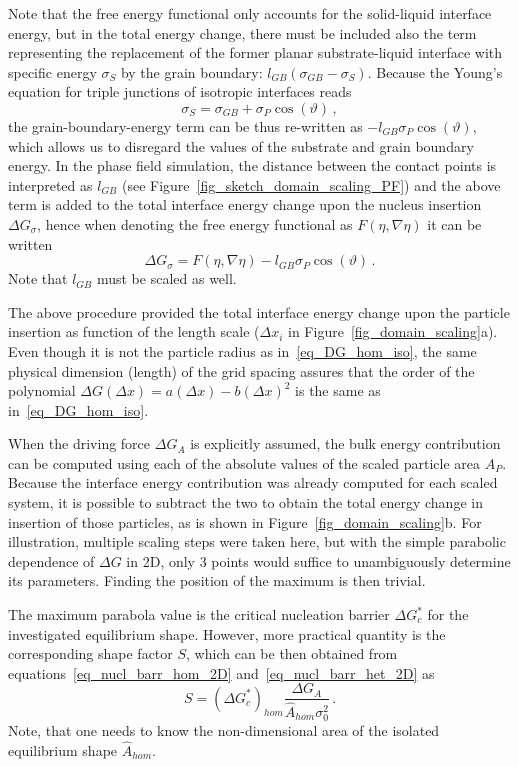 Note that the free energy functional only accounts for the solid-liquid interface energy, but in the total energy change, there must be included also the term representing the replacement of the former planar substrate-liquid interface with specific energy $\sigma_S$ by the grain boundary: $l_{GB}(\sigma_{GB}-\sigma_S)$. Because the Young's equation for triple junctions of isotropic interfaces reads
\begin{equation}\label{eq_young_iso}
	\sigma_S = \sigma_{GB}+\sigma_P\cos(\vartheta) \,,
\end{equation}
the grain-boundary-energy term can be thus re-written as $-l_{GB}\sigma_P\cos(\vartheta)$, which allows us to disregard the values of the substrate and grain boundary energy. In the phase field simulation, the distance between the contact points is interpreted as $l_{GB}$ (see Figure~\ref{fig_sketch_domain_scaling_PF}) and the above term is added to the total interface energy change upon the nucleus insertion $\Delta G_\sigma$, hence when denoting the free energy functional as $F(\eta,\nabla\eta)$ it can be written
\begin{equation}
	\Delta G_\sigma = F(\eta,\nabla\eta) - l_{GB}\sigma_P\cos(\vartheta) \,.
\end{equation}
Note that $l_{GB}$ must be scaled as well.

The above procedure provided the total interface energy change upon the particle insertion as function of the length scale ($\Delta x_i$ in Figure~\ref{fig_domain_scaling}a). Even though it is not the particle radius as in~\eqref{eq_DG_hom_iso}, the same physical dimension (length) of the grid spacing assures that the order of the polynomial $\Delta G(\Delta x) = a(\Delta x) - b(\Delta x)^2$ is the same as in~\eqref{eq_DG_hom_iso}.

When the driving force $\Delta G_A$ is explicitly assumed, the bulk energy contribution can be computed using each of the absolute values of the scaled particle area $A_P$. Because the interface energy contribution was already computed for each scaled system, it is possible to subtract the two to obtain the total energy change in insertion of those particles, as is shown in Figure~\ref{fig_domain_scaling}b. For illustration, multiple scaling steps were taken here, but with the simple parabolic dependence of $\Delta G$ in 2D, only 3 points would suffice to unambiguously determine its parameters. Finding the position of the maximum is then trivial. 

The maximum parabola value is the critical nucleation barrier $\Delta G_c^*$ for the investigated equilibrium shape. However, more practical quantity is the corresponding shape factor $S$, which can be then obtained from equations~\eqref{eq_nucl_barr_hom_2D} and~\eqref{eq_nucl_barr_het_2D} as
\begin{equation} \label{eq_NPA_PF_formula}
	S = (\Delta G_c^*)_{hom}\frac{\Delta G_A}{\hat{A}_{hom}\sigma_0^2} \,.
\end{equation}
Note, that one needs to know the non-dimensional area of the isolated equilibrium shape $\hat{A}_{hom}$.

